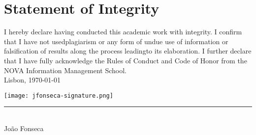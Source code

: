 \chapter*{Statement of Integrity}

I hereby declare having conducted this academic work with integrity. I confirm
that I have not usedplagiarism or any form of undue use of information or
falsification of results along the process leadingto its elaboration. I
further declare that I have fully acknowledge the Rules of Conduct and Code of
Honor from the NOVA Information Management School.\\

Lisbon, \usdate\today
\vspace{-.5cm}

\begin{minipage}{0.3\textwidth}
    \centering 
    \texttt{[image: jfonseca-signature.png]}\\
    \vspace{-1cm}
    \rule{\textwidth}{.3pt}\\
    \large{João Fonseca}
\end{minipage}
\vspace{0.3cm}


